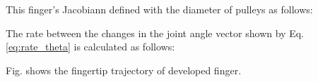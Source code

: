 \documentclass{llncs}
\begin{document}

This finger's Jacobiann defined with the diameter of pulleys as follows:



The rate between the changes in the joint angle vector shown by Eq.\ref{eq:rate_theta} is calculated as follows:

Fig. shows the fingertip trajectory of developed finger.
		
\end{document}
